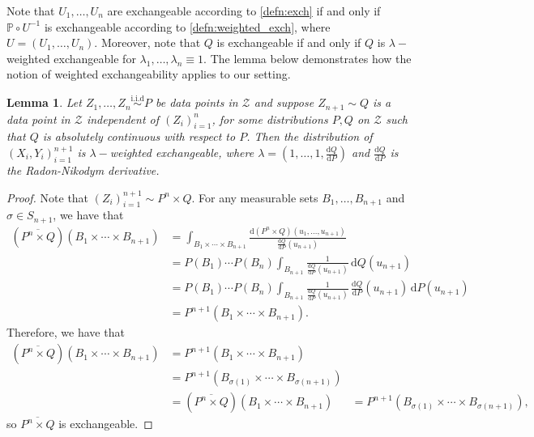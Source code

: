 \documentclass[11pt, titlepage]{article} %
\newcommand{\R}{\mathrm}
\numberwithin{equation}{section}
\newtheorem{lemma}{Lemma}
\theoremstyle{definition}
\numberwithin{theorem}{section}
\numberwithin{lemma}{section}
\numberwithin{corollary}{section}
\numberwithin{proposition}{section}
\numberwithin{definition}{section}
\numberwithin{remark}{section}
\begin{document}
\noindent
Note that \(U_1, \ldots, U_n\) are exchangeable according to \cref{defn:exch} if and only if \(\mathbb{P} \circ U^{-1}\) is exchangeable according to \cref{defn:weighted_exch}, where \(U = (U_1, \ldots, U_n)\). Moreover, note that \(Q\) is exchangeable if and only if \(Q\) is \(\lambda-\)weighted exchangeable for \(\lambda_1, \ldots, \lambda_n \equiv 1\). The lemma below demonstrates how the notion of weighted exchangeability applies to our setting.

\begin{lemma}
    Let \(Z_1, \ldots, Z_n \overset{\R{i.i.d}}{\sim} P \) be data points in \(\mathcal{Z}\) and suppose \(Z_{n+1} \sim Q\) is a data point in \(\mathcal{Z}\) independent of \((Z_i)_{i=1}^n\), for some distributions \(P, Q\) on \(\mathcal{Z}\) such that \(Q\) is absolutely continuous with respect to \(P\). Then the distribution of \((X_i, Y_i)_{i=1}^{n+1}\) is \(\lambda-\)weighted exchangeable, where \(\lambda = \left(1, \ldots, 1, \frac{\R{d}Q}{\R{d}P}\right)\) and \(\frac{\R{d}Q}{\R{d}P}\) is the Radon-Nikodym derivative.
\label{lemma:dist_shift_weighted_exch}
\end{lemma}
\begin{proof}
    Note that \((Z_i)_{i=1}^{n+1} \sim P^{n} \times Q\). For any measurable sets \(B_1, \ldots, B_{n+1}\) and \(\sigma \in S_{n+1}\), we have that \begin{align*}
        (\overline{P^n \times Q})(B_1 \times \cdots \times B_{n+1}) &= \int_{B_1 \times \cdots \times B_{n+1}} \frac{\R{d}(P^n \times Q)(u_1, \ldots, u_{n+1})}{\frac{\R{d}Q}{\R{d}P}(u_{n+1})} \\
        &= P(B_1) \cdots P(B_n) \int_{B_{n+1}} \frac{1}{\frac{\R{d}Q}{\R{d}P}(u_{n+1})} \, \R{d}Q(u_{n+1}) \\
        &= P(B_1) \cdots P(B_n) \int_{B_{n+1}} \frac{1}{\frac{\R{d}Q}{\R{d}P}(u_{n+1})} \, \frac{\R{d}Q}{\R{d}P}(u_{n+1}) \, \R{d}P(u_{n+1}) \\
        &= P^{n+1}(B_1 \times \cdots \times B_{n+1}).
    \end{align*}
    Therefore, we have that \begin{align*}
        (\overline{P^n \times Q})(B_1 \times \cdots \times B_{n+1}) &= P^{n+1}(B_1 \times \cdots \times B_{n+1}) \\
        &= P^{n+1}(B_{\sigma(1)} \times \cdots \times B_{\sigma(n+1)}) \\
        &= (\overline{P^n \times Q})(B_1 \times \cdots \times B_{n+1}) &= P^{n+1}(B_{\sigma(1)} \times \cdots \times B_{\sigma(n+1)}),
    \end{align*} so \(\overline{P^n \times Q}\) is exchangeable.
\end{proof}
\end{document}
